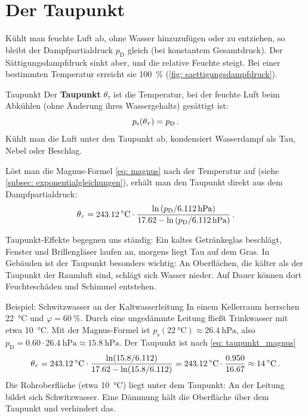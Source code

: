 \section{Der Taupunkt}\label{sec: taupunkt}
Kühlt man feuchte Luft ab, ohne Wasser hinzuzufügen oder zu entziehen, so bleibt der Dampfpartialdruck $p_\text{D}$ gleich (bei konstantem Gesamtdruck). Der Sättigungsdampfdruck sinkt aber, und die relative Feuchte steigt. Bei einer bestimmten Temperatur erreicht sie \SI{100}{\percent} (\cref{fig: saettigungsdampfdruck}).
\begin{rememberbox}{Taupunkt}
    Der \textbf{Taupunkt} $\theta_\tau$ ist die Temperatur, bei der feuchte Luft beim Abkühlen (ohne Änderung ihres Wassergehalts) gesättigt ist:
    \begin{equation}\label{eq: taupunkt_def}
        p_\text{s}(\theta_\tau) = p_\text{D} \,.
    \end{equation}
    Kühlt man die Luft unter den Taupunkt ab, kondensiert Wasserdampf als Tau, Nebel oder Beschlag.
\end{rememberbox}
Löst man die Magnus-Formel \cref{eq: magnus} nach der Temperatur auf (siehe \cref{subsec: exponentialgleichungen}), erhält man den Taupunkt direkt aus dem Dampfpartialdruck:
\begin{equation}\label{eq: taupunkt_magnus}
    \theta_\tau = \SI{243.12}{\celsius} \cdot \frac{\ln\left(p_\text{D}/\SI{6.112}{\hecto\pascal}\right)}{\num{17.62} - \ln\left(p_\text{D}/\SI{6.112}{\hecto\pascal}\right)} \mDot
\end{equation}

Taupunkt-Effekte begegnen uns ständig: Ein kaltes Getränkeglas beschlägt, Fenster und Brillengläser laufen an, morgens liegt Tau auf dem Gras. In Gebäuden ist der Taupunkt besonders wichtig: An Oberflächen, die kälter als der Taupunkt der Raumluft sind, schlägt sich Wasser nieder. Auf Dauer können dort Feuchteschäden und Schimmel entstehen.

\begin{examplebox}[]{Beispiel: Schwitzwasser an der Kaltwasserleitung}
    In einem Kellerraum herrschen \SI{22}{\celsius} und $\varphi = \SI{60}{\percent}$. Durch eine ungedämmte Leitung fließt Trinkwasser mit etwa \SI{10}{\celsius}. Mit der Magnus-Formel ist $p_\text{s}(\SI{22}{\celsius}) \approx \SI{26.4}{\hecto\pascal}$, also $p_\text{D} = \num{0.60} \cdot \SI{26.4}{\hecto\pascal} \approx \SI{15.8}{\hecto\pascal}$. Der Taupunkt ist nach \cref{eq: taupunkt_magnus}
    \begin{equation*}
        \theta_\tau = \SI{243.12}{\celsius} \cdot \frac{\ln(\num{15.8}/\num{6.112})}{\num{17.62} - \ln(\num{15.8}/\num{6.112})} = \SI{243.12}{\celsius} \cdot \frac{\num{0.950}}{\num{16.67}} \approx \SI{14}{\celsius} \,.
    \end{equation*}
    Die Rohroberfläche (etwa \SI{10}{\celsius}) liegt unter dem Taupunkt: An der Leitung bildet sich Schwitzwasser. Eine Dämmung hält die Oberfläche über dem Taupunkt und verhindert das.
\end{examplebox}

